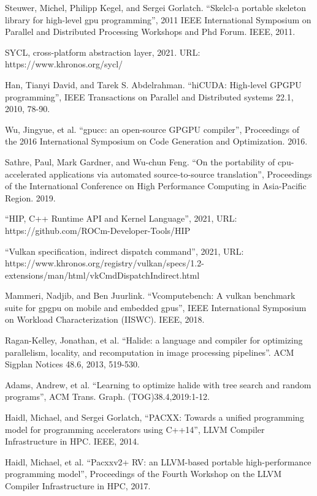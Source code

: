 \documentclass[11pt,fleqn,english,russian]{report} %
\begin{document}
\begin{thebibliography}{10}
	 Steuwer, Michel, Philipp Kegel, and Sergei Gorlatch. ``Skelcl-a portable skeleton library for high-level gpu programming'', 2011 IEEE International Symposium on Parallel and Distributed Processing Workshops and Phd Forum. IEEE, 2011. 
	
	 SYCL, cross-platform abstraction layer, 2021. URL: https://www.khronos.org/sycl/	
	
	
	 Han, Tianyi David, and Tarek S. Abdelrahman. ``hiCUDA: High-level GPGPU programming'', IEEE Transactions on Parallel and Distributed systems 22.1, 2010, 78-90. 	
	
	 Wu, Jingyue, et al. ``gpucc: an open-source GPGPU compiler'', Proceedings of the 2016 International Symposium on Code Generation and Optimization. 2016. 	
	
	 Sathre, Paul, Mark Gardner, and Wu-chun Feng. ``On the portability of cpu-accelerated applications via automated source-to-source translation'', Proceedings of the International Conference on High Performance Computing in Asia-Pacific Region. 2019.
	
	 ``HIP, C++ Runtime API and Kernel Language'', 2021, URL: https://github.com/ROCm-Developer-Tools/HIP	
	
	 ``Vulkan specification, indirect dispatch command'', 2021, URL: https://www.khronos.org/registry/vulkan/specs/1.2-extensions/man/html/vkCmdDispatchIndirect.html
	
	 Mammeri, Nadjib, and Ben Juurlink. ``Vcomputebench: A vulkan benchmark suite for gpgpu on mobile and embedded gpus'', IEEE International Symposium on Workload Characterization (IISWC). IEEE, 2018. 
	
	 Ragan-Kelley, Jonathan, et al. ``Halide: a language and compiler for optimizing parallelism, locality, and recomputation in image processing pipelines''. ACM Sigplan Notices 48.6, 2013, 519-530. 
	
	 Adams, Andrew, et al. ``Learning to optimize halide with tree search and random programs'', ACM Trans. Graph. (TOG)38.4,2019:1-12. 
	
	 Haidl, Michael, and Sergei Gorlatch, ``PACXX: Towards a unified programming model for programming accelerators using C++14'', LLVM Compiler Infrastructure in HPC. IEEE, 2014.
	
	 Haidl, Michael, et al. ``Pacxxv2+ RV: an LLVM-based portable high-performance programming model'', Proceedings of the Fourth Workshop on the LLVM Compiler Infrastructure in HPC, 2017. 
	

\end{thebibliography}
\end{document}
